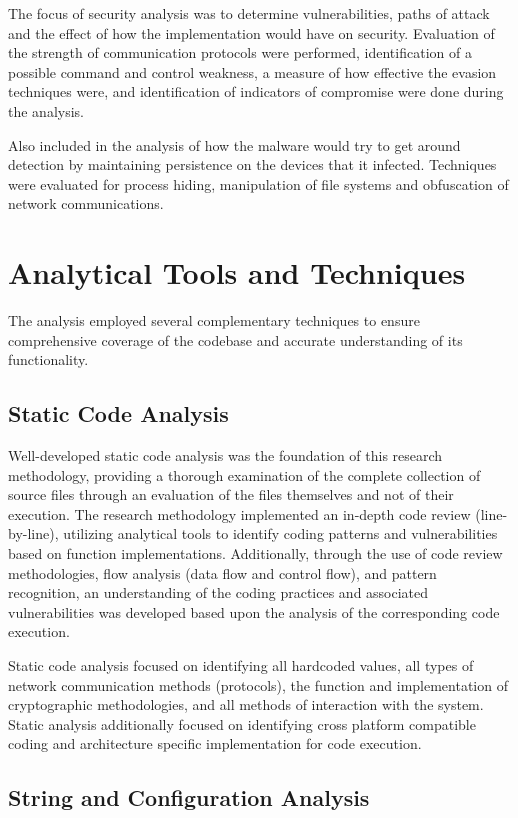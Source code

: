 \documentclass[12pt,letterpaper]{report}
\begin{document}
The focus of security analysis was to determine vulnerabilities, paths of attack and the effect of how the implementation would have on security. Evaluation of the strength of communication protocols were performed, identification of a possible command and control weakness, a measure of how effective the evasion techniques were, and identification of indicators of compromise were done during the analysis.

Also included in the analysis of how the malware would try to get around detection by maintaining persistence on the devices that it infected. Techniques were evaluated for process hiding, manipulation of file systems and obfuscation of network communications.

\section{Analytical Tools and Techniques}

The analysis employed several complementary techniques to ensure comprehensive coverage of the codebase and accurate understanding of its functionality.

\subsection{Static Code Analysis}

Well-developed static code analysis was the foundation of this research methodology, providing a thorough examination of the complete collection of source files through an evaluation of the files themselves and not of their execution. The research methodology implemented an in-depth code review (line-by-line), utilizing analytical tools to identify coding patterns and vulnerabilities based on function implementations. Additionally, through the use of code review methodologies, flow analysis (data flow and control flow), and pattern recognition, an understanding of the coding practices and associated vulnerabilities was developed based upon the analysis of the corresponding code execution.

Static code analysis focused on identifying all hardcoded values, all types of network communication methods (protocols), the function and implementation of cryptographic methodologies, and all methods of interaction with the system. Static analysis additionally focused on identifying cross platform compatible coding and architecture specific implementation for code execution.

\subsection{String and Configuration Analysis}
\end{document}
